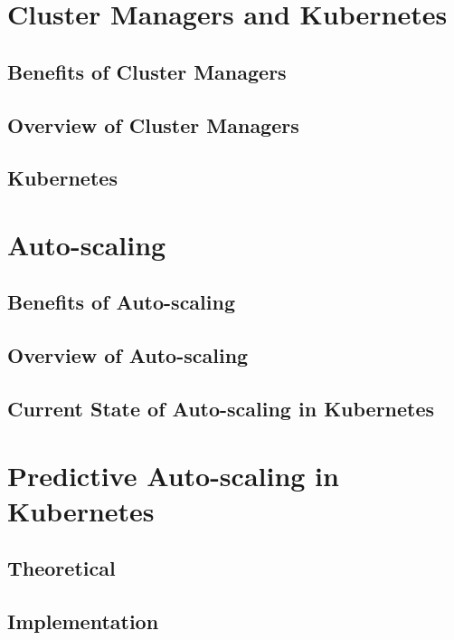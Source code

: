 \documentclass{beamer}
\begin{document}
\section{Cluster Managers and Kubernetes}

\subsection{Benefits of Cluster Managers}

\subsection{Overview of Cluster Managers}

\subsection{Kubernetes}

\section{Auto-scaling}

\subsection{Benefits of Auto-scaling}

\subsection{Overview of Auto-scaling}

\subsection{Current State of Auto-scaling in Kubernetes}

\section{Predictive Auto-scaling in Kubernetes}

\subsection{Theoretical}

\subsection{Implementation}
\end{document}
